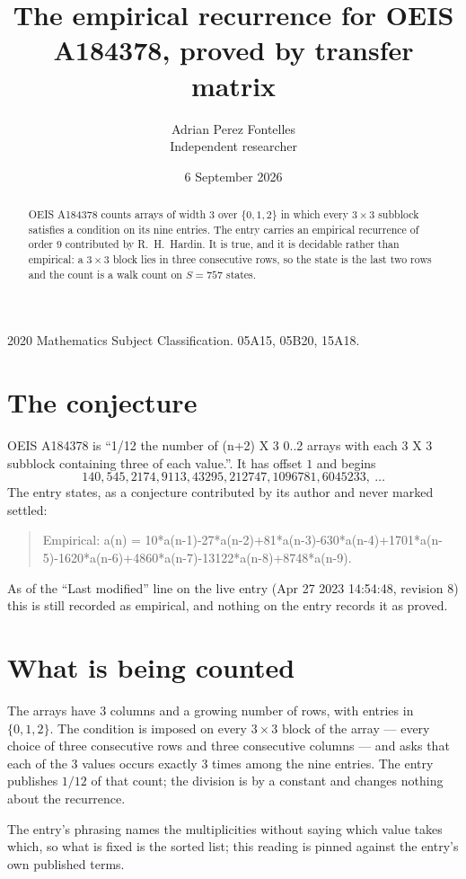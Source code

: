 \documentclass[11pt,a4paper]{article}
\title{The empirical recurrence for OEIS A184378, proved by transfer matrix}
\author{Adrian Perez Fontelles\\ \small Independent researcher}
\date{6 September 2026}
\theoremstyle{plain}
\theoremstyle{definition}
\begin{document}
\maketitle

\begin{abstract}
OEIS A184378 counts arrays of width $3$ over $\{0,1,2\}$ in which every $3\times3$ subblock
satisfies a condition on its nine entries. The entry carries an empirical recurrence of order
$9$ contributed by R.~H.~Hardin. It is true, and it is decidable rather than empirical: a
$3\times3$ block lies in three consecutive rows, so the state is the last two rows and the
count is a walk count on $S=757$ states.
\end{abstract}

\noindent\small 2020 Mathematics Subject Classification. 05A15, 05B20, 15A18.\normalsize

\section{The conjecture}

OEIS A184378 is ``1/12 the number of (n+2) X 3 0..2 arrays with each 3 X 3 subblock containing three of each value.''. It has offset $1$ and begins
\[
140, 545, 2174, 9113, 43295, 212747, 1096781, 6045233,\ \dots
\]
The entry states, as a conjecture contributed by its author and never marked settled:
\begin{quote}
Empirical: a(n) = 10*a(n-1)-27*a(n-2)+81*a(n-3)-630*a(n-4)+1701*a(n-5)-1620*a(n-6)+4860*a(n-7)-13122*a(n-8)+8748*a(n-9).
\end{quote}
As of the ``Last modified'' line on the live entry (Apr 27 2023 14:54:48, revision 8) this is still
recorded as empirical, and nothing on the entry records it as proved.

\section{What is being counted}

The arrays have $3$ columns and a growing number of rows, with entries in $\{0,1,2\}$. The
condition is imposed on every $3\times3$ block of the array --- every choice of three
consecutive rows and three consecutive columns --- and asks that each of the $3$ values occurs exactly $3$ times among the nine entries. The entry publishes $1/12$ of that count; the division is by a constant and changes nothing about the recurrence.

The entry's phrasing names the multiplicities without saying which value takes which, so what is fixed is the sorted list; this reading is pinned against the entry's own published terms.
\end{document}
